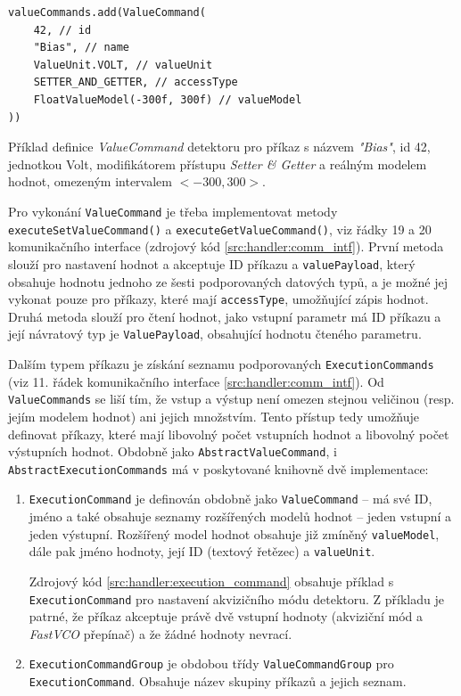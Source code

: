 \begin{code}[h!]
\begin{verbatim}
valueCommands.add(ValueCommand(
    42, // id
    "Bias", // name
    ValueUnit.VOLT, // valueUnit
    SETTER_AND_GETTER, // accessType
    FloatValueModel(-300f, 300f) // valueModel
))
\end{verbatim}
\caption{Příklad definice \textit{ValueCommand} detektoru pro příkaz s názvem \textit{"Bias"}, id 42, jednotkou Volt, modifikátorem přístupu \textit{Setter \& Getter} a reálným modelem hodnot, omezeným intervalem $<-300,300>$.}
\label{src:handler:value_command}
\end{code}

Pro vykonání \texttt{ValueCommand} je třeba implementovat metody \texttt{executeSetValueCommand()} a \texttt{executeGetValueCommand()}, viz řádky 19 a 20 komunikačního interface (zdrojový kód \ref{src:handler:comm_intf}). První metoda slouží pro nastavení hodnot a akceptuje ID příkazu a \texttt{valuePayload}, který obsahuje hodnotu jednoho ze šesti podporovaných datových typů, a je možné jej vykonat pouze pro příkazy, které mají \texttt{accessType}, umožňující zápis hodnot. Druhá metoda slouží pro čtení hodnot, jako vstupní parametr má ID příkazu a její návratový typ je \texttt{ValuePayload}, obsahující hodnotu čteného parametru.

Dalším typem příkazu je získání seznamu podporovaných \texttt{ExecutionCommands} (viz 11. řádek komunikačního interface \ref{src:handler:comm_intf}). Od \texttt{ValueCommands} se liší tím, že vstup a výstup není omezen stejnou veličinou (resp. jejím modelem hodnot) ani jejich množstvím. Tento přístup tedy umožňuje definovat příkazy, které mají libovolný počet vstupních hodnot a libovolný počet výstupních hodnot. Obdobně jako \texttt{AbstractValueCommand}, i \texttt{AbstractExecutionCommands} má v poskytované knihovně dvě implementace:
\begin{enumerate}[label=(\roman*)]
	\item \texttt{ExecutionCommand} je definován obdobně jako \texttt{ValueCommand} -- má své ID, jméno a také obsahuje seznamy rozšířených modelů hodnot -- jeden vstupní a jeden výstupní. Rozšířený model hodnot obsahuje již zmíněný \texttt{valueModel}, dále pak jméno hodnoty, její ID (textový řetězec) a \texttt{valueUnit}.
	
	Zdrojový kód \ref{src:handler:execution_command} obsahuje příklad s \texttt{ExecutionCommand} pro nastavení akvizičního módu detektoru. Z příkladu je patrné, že příkaz akceptuje právě dvě vstupní hodnoty (akviziční mód a \textit{FastVCO} přepínač) a že žádné hodnoty nevrací.
	
	\item \texttt{ExecutionCommandGroup} je obdobou třídy \texttt{ValueCommandGroup} pro \texttt{ExecutionCommand}. Obsahuje název skupiny příkazů a jejich seznam.
\end{enumerate}


